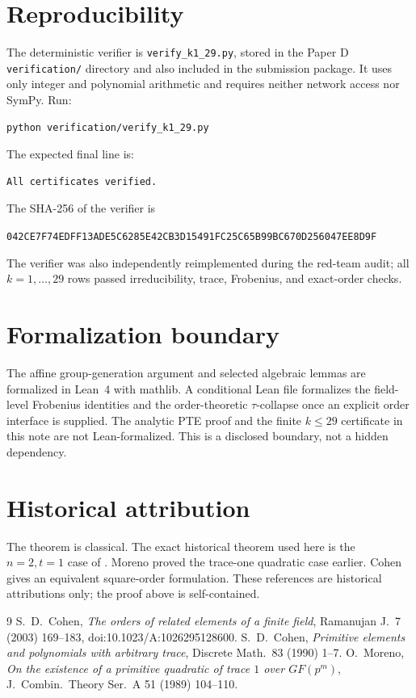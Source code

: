 \documentclass[11pt]{article}
\begin{document}
\section{Reproducibility}
The deterministic verifier is \texttt{verify\_k1\_29.py}, stored in the Paper D \texttt{verification/} directory and also included in the submission package. It uses only integer and polynomial arithmetic and requires neither network access nor SymPy. Run:
\begin{verbatim}
python verification/verify_k1_29.py
\end{verbatim}
The expected final line is:
\begin{verbatim}
All certificates verified.
\end{verbatim}
The SHA-256 of the verifier is
\begin{center}
\texttt{042CE7F74EDFF13ADE5C6285E42CB3D15491FC25C65B99BC670D256047EE8D9F}
\end{center}
The verifier was also independently reimplemented during the red-team audit; all \(k=1,\dots,29\) rows passed irreducibility, trace, Frobenius, and exact-order checks.
\section{Formalization boundary}
The affine group-generation argument and selected algebraic lemmas are formalized in Lean~4 with mathlib. A conditional Lean file formalizes the field-level Frobenius identities and the order-theoretic \(\tau\)-collapse once an explicit order interface is supplied. The analytic PTE proof and the finite \(k\le29\) certificate in this note are not Lean-formalized. This is a disclosed boundary, not a hidden dependency.
\section{Historical attribution}
The theorem is classical. The exact historical theorem used here is the \(n=2,t=1\) case of \cite[Theorem~1, p.~1]{Coh90}. Moreno \cite{Mor} proved the trace-one quadratic case earlier. Cohen \cite[Theorem~1.5, p.~170]{Coh} gives an equivalent square-order formulation. These references are historical attributions only; the proof above is self-contained.
\begin{thebibliography}{9}
 S.~D.~Cohen, \emph{The orders of related elements of a finite field}, Ramanujan J.~7 (2003) 169--183, doi:10.1023/A:1026295128600.
 S.~D.~Cohen, \emph{Primitive elements and polynomials with arbitrary trace}, Discrete Math.~83 (1990) 1--7.
 O.~Moreno, \emph{On the existence of a primitive quadratic of trace \(1\) over \(GF(p^m)\)}, J.~Combin.~Theory Ser.~A 51 (1989) 104--110.
\end{thebibliography}
\end{document}
